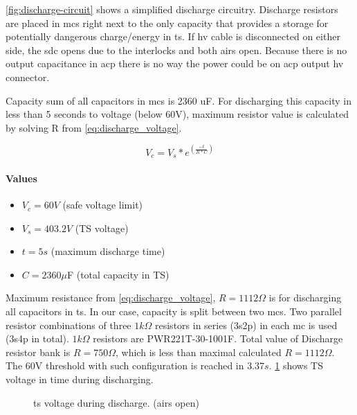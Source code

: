 \ref{fig:discharge-circuit} shows a simplified discharge circuitry. Discharge resistors are placed in \glspl{mc} right next to the only capacity that provides a storage for potentially dangerous charge/energy in \gls{ts}. If \gls{hv} cable is disconnected on either side, the \gls{sdc} opens due to the interlocks and both \glspl{air} open. Because there is no output capacitance in \gls{acp} there is no way the power could be on \gls{acp} output \gls{hv} connector.

Capacity sum of all capacitors in \glspl{mc} is 2360 uF. For discharging this capacity in less than 5 seconds to voltage (below 60V), maximum resistor value is calculated by solving R from \ref{eq:discharge_voltage}.

\begin{equation}
	V_{c}=V_{s}*e^{(\frac{-t}{R*C})}
	\label{eq:discharge_voltage}
\end{equation}

\paragraph{Values}
\begin{itemize}
	\item $V_c = 60 V$ (safe voltage limit)
	\item $V_s = 403.2 V$ (TS voltage)
	\item $t = 5 s$ (maximum discharge time)
	\item $C = 2360\mu$F (total capacity in TS)
\end{itemize}

Maximum resistance from \ref{eq:discharge_voltage}, $R = 1112\Omega$ is for discharging all capacitors in \gls{ts}. In our case, capacity is split between two \glspl{mc}. Two parallel resistor combinations of three $1k\Omega$ resistors in series (3s2p) in each \gls{mc} is used (3s4p in total). $1k\Omega$ resistors are PWR221T-30-1001F. Total value of Discharge resistor bank is $R = 750\Omega$, which is less than maximal calculated $R = 1112\Omega$. The 60V threshold with such configuration is reached in $3.37s$. \ref{fig:discharge_voltage_time} shows TS voltage in time during discharging.

\begin{figure}
	\caption{\gls{ts} voltage during discharge. (\glspl{air} open)}
	\label{fig:discharge_voltage_time}
\end{figure}


